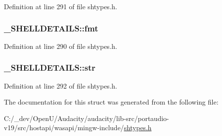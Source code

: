 Definition at line 291 of file shtypes.\+h.

\subsubsection[{\texorpdfstring{fmt}{fmt}}]{ \+\_\+\+S\+H\+E\+L\+L\+D\+E\+T\+A\+I\+L\+S\+::fmt}\hypertarget{struct___s_h_e_l_l_d_e_t_a_i_l_s_a5592a7ce2a87649073a753e3fb805962}{}\label{struct___s_h_e_l_l_d_e_t_a_i_l_s_a5592a7ce2a87649073a753e3fb805962}


Definition at line 290 of file shtypes.\+h.

\subsubsection[{\texorpdfstring{str}{str}}]{ \+\_\+\+S\+H\+E\+L\+L\+D\+E\+T\+A\+I\+L\+S\+::str}\hypertarget{struct___s_h_e_l_l_d_e_t_a_i_l_s_a36f0e90966ad2af76f2f4d8c2991bfe4}{}\label{struct___s_h_e_l_l_d_e_t_a_i_l_s_a36f0e90966ad2af76f2f4d8c2991bfe4}


Definition at line 292 of file shtypes.\+h.



The documentation for this struct was generated from the following file\+:\begin{DoxyCompactItemize}
\item 
C\+:/\+\_\+dev/\+Open\+U/\+Audacity/audacity/lib-\/src/portaudio-\/v19/src/hostapi/wasapi/mingw-\/include/\hyperlink{shtypes_8h}{shtypes.\+h}\end{DoxyCompactItemize}
